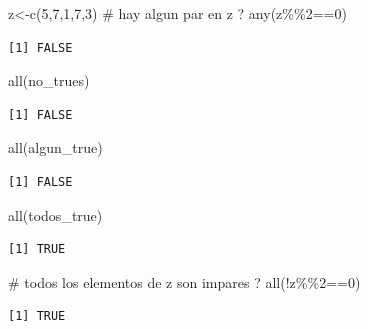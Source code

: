 \documentclass[
  ignorenonframetext,
  aspectratio=169,
  spanish,
]{beamer}
\newenvironment{Shaded}{\begin{snugshade}}{\end{snugshade}}
\newcommand{\CommentTok}[1]{\textcolor[rgb]{0.37,0.37,0.37}{#1}}
\newcommand{\DecValTok}[1]{\textcolor[rgb]{0.68,0.00,0.00}{#1}}
\newcommand{\FunctionTok}[1]{\textcolor[rgb]{0.28,0.35,0.67}{#1}}
\newcommand{\NormalTok}[1]{\textcolor[rgb]{0.00,0.23,0.31}{#1}}
\newcommand{\OtherTok}[1]{\textcolor[rgb]{0.00,0.23,0.31}{#1}}
\newcommand{\SpecialCharTok}[1]{\textcolor[rgb]{0.37,0.37,0.37}{#1}}
\begin{document}
\begin{frame}[fragile]{}
\label{section-14}
\begin{Shaded}
\begin{Highlighting}[]
\NormalTok{z}\OtherTok{\textless{}{-}}\FunctionTok{c}\NormalTok{(}\DecValTok{5}\NormalTok{,}\DecValTok{7}\NormalTok{,}\DecValTok{1}\NormalTok{,}\DecValTok{7}\NormalTok{,}\DecValTok{3}\NormalTok{)}
\CommentTok{\# hay algun par en z ? }
\FunctionTok{any}\NormalTok{(z}\SpecialCharTok{\%\%}\DecValTok{2}\SpecialCharTok{==}\DecValTok{0}\NormalTok{)}
\end{Highlighting}
\end{Shaded}

\begin{verbatim}
[1] FALSE
\end{verbatim}
\end{frame}

\begin{frame}[fragile]{}
\label{section-15}
\begin{Shaded}
\begin{Highlighting}[]
\FunctionTok{all}\NormalTok{(no\_trues)}
\end{Highlighting}
\end{Shaded}

\begin{verbatim}
[1] FALSE
\end{verbatim}

\begin{Shaded}
\begin{Highlighting}[]
\FunctionTok{all}\NormalTok{(algun\_true)}
\end{Highlighting}
\end{Shaded}

\begin{verbatim}
[1] FALSE
\end{verbatim}

\begin{Shaded}
\begin{Highlighting}[]
\FunctionTok{all}\NormalTok{(todos\_true)}
\end{Highlighting}
\end{Shaded}

\begin{verbatim}
[1] TRUE
\end{verbatim}

\begin{Shaded}
\begin{Highlighting}[]
\CommentTok{\# todos los elementos de z son impares ?}
\FunctionTok{all}\NormalTok{(}\SpecialCharTok{!}\NormalTok{z}\SpecialCharTok{\%\%}\DecValTok{2}\SpecialCharTok{==}\DecValTok{0}\NormalTok{)}
\end{Highlighting}
\end{Shaded}

\begin{verbatim}
[1] TRUE
\end{verbatim}
\end{frame}
\end{document}
